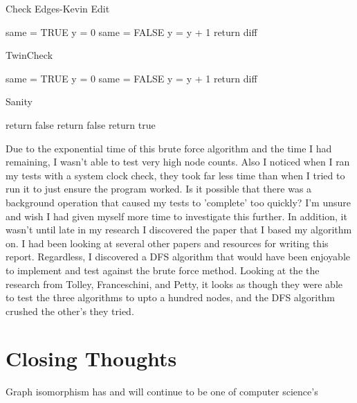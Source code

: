 \documentclass[notitlepage]{report}
\begin{document}
\begin{algorithm}
\caption{Check Edges-Kevin Edit}
\begin{algorithmic}[1]

    \State same = TRUE
        \State y = 0
        	\State same = FALSE
        \EndIf
        \State y = y + 1
        \EndWhile
    \EndFor
    \State return diff
\label{CheckEdge2}
\EndProcedure

\end{algorithmic}
\end{algorithm}



\begin{algorithm}
\caption{TwinCheck}
\begin{algorithmic}[1]

    \State same = TRUE
        \State y = 0
        	\State same = FALSE
        \EndIf
        \State y = y + 1
        \EndWhile
    \EndFor
    \State return diff
\label{CheckEdge3}
\EndProcedure

\end{algorithmic}
\end{algorithm}

\begin{algorithm}
\caption{Sanity}
\begin{algorithmic}[1]

    	\State return false
    	\State return false
    \Else
    	\State return true
    \EndIf
\label{SanityCheck1}
\EndProcedure

\end{algorithmic}
\end{algorithm}
\newpage

Due to the exponential time of this brute force algorithm and the time I had remaining, I wasn't able to test very high node counts. Also I noticed when I ran my tests with a system clock check, they took far less time than when I tried to run it to just ensure the program worked. Is it possible that there was a background operation that caused my tests to 'complete' too quickly? I'm unsure and wish I had given myself more time to investigate this further. In  addition, it wasn't until late in my research I discovered the paper that I based my algorithm on. I had been looking at several other papers and resources for writing this report. Regardless, I discovered a DFS algorithm that would have been enjoyable to implement and test against the brute force method. Looking at the the research from Tolley, Franceschini, and Petty, it looks as though they were able to test the three algorithms to upto a hundred nodes, and the DFS algorithm crushed the other's they tried.~\cite{tolley}

\section*{Closing Thoughts}
Graph isomorphism has and will continue to be one of computer science's 




\end{document}
